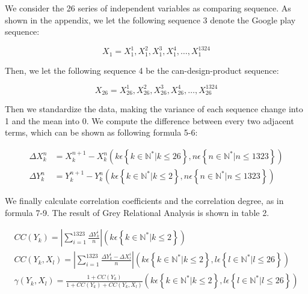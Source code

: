 We consider the 26 series of independent variables as comparing sequence. As shown in the appendix, we let the following sequence 3 denote the Google play sequence:

\begin{equation}
X _ { 1 } = X _ { 1 } ^ { 1 } , X _ { 1 } ^ { 2 } , X _ { 1 } ^ { 3 } , X _ { 1 } ^ { 4 } , \ldots , X _ { 1 } ^ { 1324 }
\end{equation}
	
	Then, we let the following sequence 4 be the can-design-product sequence: 
	
	\begin{equation}
	X _ { 26 } = X _ { 26 } ^ { 1 } , X _ { 26 } ^ { 2 } , X _ { 26 } ^ { 3 } , X _ { 26 } ^ { 4 } , \ldots , X _ { 26 } ^ { 1324 }
	\end{equation}
	
	Then we standardize the data, making the variance of each sequence change into 1 and the mean into 0. We compute the difference between every two adjacent terms, which can be shown as following formula 5-6:
	
	\begin{equation}
	\begin{aligned} \Delta X _ { k } ^ { n } & = X _ { k } ^ { n + 1 } - X _ { k } ^ { n } \left( k \epsilon \left\{ k \in \mathbb { N } ^ { * } | k \leq 26 \right\} , n \epsilon \left\{ n \in \mathbb { N } ^ { * } | n \leq 1323 \right\} \right) \\ \Delta Y _ { k } ^ { n } & = Y _ { k } ^ { n + 1 } - Y _ { k } ^ { n } \left( k \epsilon \left\{ k \in \mathbb { N } ^ { * } | k \leq 2 \right\} , n \epsilon \left\{ n \in \mathbb { N } ^ { * } | n \leq 1323 \right\} \right) \end{aligned}
	\end{equation}
	
	We finally calculate correlation coefficients and the correlation degree, as in formula 7-9. The result of Grey Relational Analysis is shown in table 2.
	
	\begin{equation}
	\begin{array} { c } { C C \left( Y _ { k } \right) = \left| \sum _ { i = 1 } ^ { 1323 } \frac { \Delta Y _ { k } ^ { i } } { n } \right| \left( k \epsilon \left\{ k \in \mathbb { N } ^ { * } | k \leq 2 \right\} \right) } \\ { C C \left( Y _ { k } , X _ { l } \right) = \left| \sum _ { i = 1 } ^ { 1323 } \frac { \Delta Y _ { k } ^ { i } - \Delta X _ { l } ^ { i } } { n } \right| \left( k \epsilon \left\{ k \in \mathbb { N } ^ { * } | k \leq 2 \right\} , l \epsilon \left\{ l \in \mathbb { N } ^ { * } | l \leq 26 \right\} \right) } \\ { \gamma \left( Y _ { k } , X _ { l } \right) = \frac { 1 + C C \left( Y _ { k } \right) } { 1 + C C \left( Y _ { k } \right) + C C \left( Y _ { k } , X _ { l } \right) } \left( k \epsilon \left\{ k \in \mathbb { N } ^ { * } | k \leq 2 \right\} , l \epsilon \left\{ l \in \mathbb { N } ^ { * } | l \leq 26 \right\} \right) } \end{array}
	\end{equation}
	
